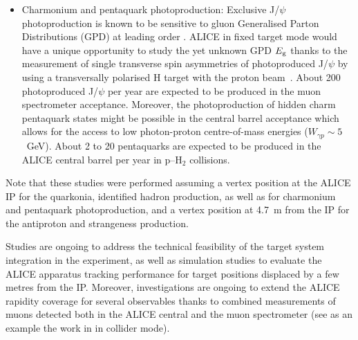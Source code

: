 \documentclass[../report.tex]{subfiles}
\begin{document}
\begin{itemize}
\item{Charmonium and pentaquark photoproduction: Exclusive J/$\psi$ photoproduction is known to be sensitive to gluon Generalised Parton Distributions (GPD) at leading order \cite{Ivanov:2004vd}. ALICE in fixed target mode would have a unique opportunity to study the yet unknown GPD $E_{\rm g}$ thanks to the measurement of single transverse spin asymmetries of photoproduced J/$\psi$ by using a transversally polarised H target with the proton beam~\cite{Massacrier:2017lib,Koempel:2011rc}. About 200 photoproduced J/$\psi$ per year are expected to be produced in the muon spectrometer acceptance. Moreover, the photoproduction of hidden charm pentaquark states \cite{Wang:2015jsa} might be possible in the central barrel acceptance which allows for the access to low photon-proton centre-of-mass energies ($W_{\gamma p} \sim 5$~GeV). About 2 to 20 pentaquarks are expected to be produced in the ALICE central barrel per year in p--H$_{2}$ collisions.}
\end{itemize}

Note that these studies were performed assuming a vertex position at the ALICE IP for the quarkonia, identified hadron production, as well as for charmonium and pentaquark photoproduction, and a vertex position at 4.7~m from the IP for the antiproton and strangeness production. 

Studies are ongoing to address the technical feasibility of the target system integration in the experiment, as well as simulation studies to evaluate the ALICE apparatus tracking performance for target positions displaced by a few metres from the IP. Moreover, investigations are ongoing to extend the ALICE rapidity coverage for several observables thanks to combined measurements of muons detected both in the ALICE central and the muon spectrometer (see as an example the work in \cite{Acharya:2018jua} in collider mode).
\end{document}
